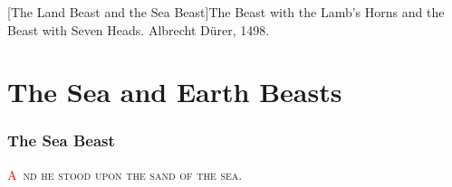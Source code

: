 [The Land Beast and the Sea Beast]{The Beast with the Lamb's Horns and the Beast with Seven Heads. Albrecht Dürer, 1498.}

\chapter{The Sea and Earth Beasts}
\fancyhead{} %
\subsection*{The Sea Beast}
\lettrine[lines=3, slope=0.5em]{\textcolor{red}{A}}{\ nd he stood upon the sand of the sea.}

